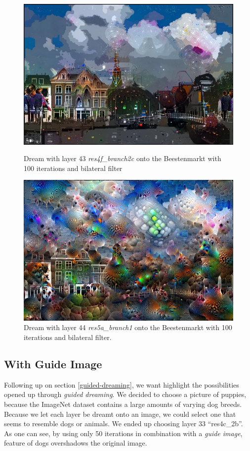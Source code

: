 \begin{figure}[H]
	\centering
	\includegraphics[width=1\linewidth]{img/bilateral1.jpg}
	\caption{Dream with layer 43 \emph{res4f\_branch2c} onto the Beestenmarkt with 100 iterations and bilateral filter}
	\label{fig:bilateral1}
	\endminipage\hfill
	\centering
	\includegraphics[width=1\linewidth]{img/beestenmarkt_res5a_branch1_bilateral.jpg}
	\caption{Dream with layer 44 \emph{res5a\_branch1} onto the Beestenmarkt with 100 iterations and bilateral filter.}
	\label{fig:bilateral2}
	\endminipage\hfill
\end{figure}


\subsection{With Guide Image}
\label{sec:withguide}
Following up on section \ref{guided-dreaming}, we want highlight the possibilities opened up through \textit{guided dreaming}.
We decided to choose a picture of puppies, because the ImageNet dataset contains a large amounts of varying dog breeds.
Because we let each layer be dreamt onto an image, we could select one that seems to resemble dogs or animals.
We ended up choosing layer 33 \enquote{res4c\_2b}.
As one can see, by using only 50 iterations in combination with a \textit{guide image}, feature of dogs overshadows the original image.

